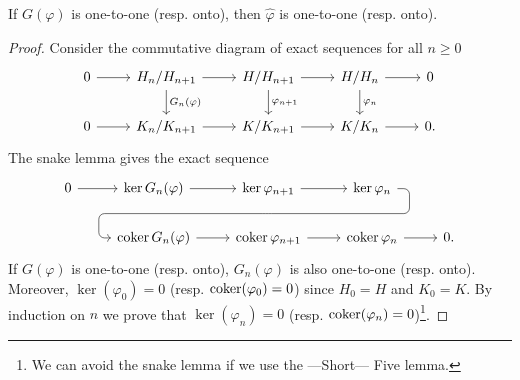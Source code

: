 \begin{prop}\label{filteredgroups}
    If $G(\varphi)$ is one-to-one (resp. onto), then $\hat\varphi$ is one-to-one (resp. onto).
\end{prop}

\begin{proof}
    Consider the commutative diagram of exact sequences for all $n\geq 0$
    \[
    \begin{tikzcd}
        0 \rar & H_n/H_{n+1} \rar \ar[d, "G_n(\varphi)"] & H/H_{n+1} \rar \ar[d, "\varphi_{n+1}"] & H/H_n \rar \ar[d, "\varphi_n"] & 0 \\
        0 \rar & K_n/K_{n+1} \rar & K/K_{n+1} \rar & K/K_n \rar & 0.
    \end{tikzcd}
    \]
    The snake lemma gives the exact sequence
    \[
    \begin{tikzcd}
       0 \rar & \ker G_n(\varphi) \rar & \ker \varphi_{n+1} \rar
             \ar[draw=none]{d}[name=X, anchor=center]{}
    & \ker \varphi_n \ar[rounded corners,
            to path={ -- ([xshift=2ex]\tikztostart.east)
                      |- (X.center) \tikztonodes
                      -| ([xshift=-2ex]\tikztotarget.west)
                      -- (\tikztotarget)}]{dll}[at end]{} \\      
  &\coker G_n(\varphi) \rar & \coker \varphi_{n+1} \rar & \coker \varphi_n \rar & 0.
    \end{tikzcd}
    \]
    If $G(\varphi)$ is one-to-one (resp. onto), $G_n(\varphi)$ is also one-to-one (resp. onto). Moreover, $\ker(\varphi_0)=0$ (resp. $\operatorname{coker}(\varphi_0)=0$) since $H_0=H$ and $K_0=K$. By induction on $n$ we prove that $\ker(\varphi_n)=0$ (resp. $\operatorname{coker}(\varphi_n)=0$)\footnote{We can avoid the snake lemma if we use the ---Short--- Five lemma.}.
\end{proof}

